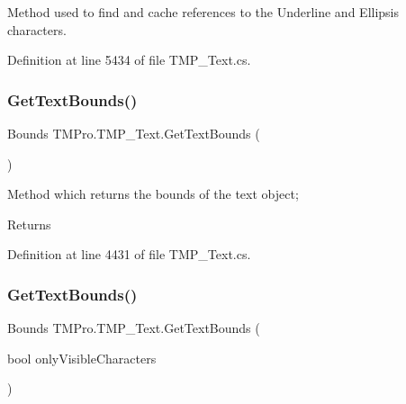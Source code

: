 Method used to find and cache references to the Underline and Ellipsis characters. 



Definition at line 5434 of file T\+M\+P\+\_\+\+Text.\+cs.

\mbox{\label{class_t_m_pro_1_1_t_m_p___text_a283ef3decc85a36d428cbc270647dde6}} 
\subsubsection{\texorpdfstring{GetTextBounds()}{GetTextBounds()}\hspace{0.1cm}{\footnotesize\ttfamily [1/2]}}
{\footnotesize\ttfamily Bounds T\+M\+Pro.\+T\+M\+P\+\_\+\+Text.\+Get\+Text\+Bounds (\begin{DoxyParamCaption}{ }\end{DoxyParamCaption})\hspace{0.3cm}{\ttfamily [protected]}}



Method which returns the bounds of the text object; 

\begin{DoxyReturn}{Returns}

\end{DoxyReturn}


Definition at line 4431 of file T\+M\+P\+\_\+\+Text.\+cs.

\mbox{\label{class_t_m_pro_1_1_t_m_p___text_a06813292362ae8e0c09c214dca0b570a}} 
\subsubsection{\texorpdfstring{GetTextBounds()}{GetTextBounds()}\hspace{0.1cm}{\footnotesize\ttfamily [2/2]}}
{\footnotesize\ttfamily Bounds T\+M\+Pro.\+T\+M\+P\+\_\+\+Text.\+Get\+Text\+Bounds (\begin{DoxyParamCaption}\item[{bool}]{only\+Visible\+Characters }\end{DoxyParamCaption})\hspace{0.3cm}{\ttfamily [protected]}}



